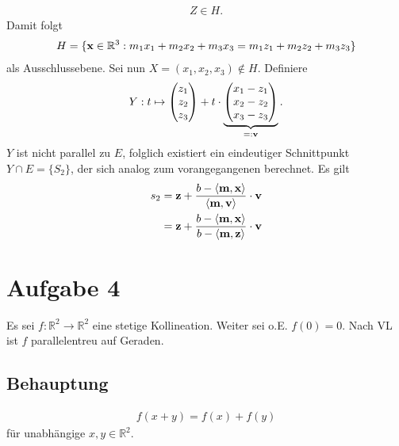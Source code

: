 \documentclass[11pt]{article}
\renewcommand{\vec}{\textbf}
\begin{document}
\begin{enumerate}
\begin{equation*}
	\begin{aligned}
	Z \in H.
	\end{aligned}
	\end{equation*}
	Damit folgt
	\begin{equation*}
	\begin{aligned}
	H = \lbrace \vec x \in \mathbb{R}^3 : m_1x_1 + m_2x_2 + m_3x_3 = m_1z_1 + m_2z_2 + m_3z_3 \rbrace
	\end{aligned}
	\end{equation*}
	als Ausschlussebene. Sei nun $ X = (x_1,x_2,x_3) \notin H $. Definiere
	\begin{equation*}
	\begin{aligned}
	Y : t \mapsto \begin{pmatrix}
	z_1 \\ z_2 \\ z_3
	\end{pmatrix} + t \cdot \underbrace{\begin{pmatrix}
	x_1 - z_1\\
	x_2 - z_2\\
	x_3 - z_3
	\end{pmatrix}}_{=:\vec v}.
	\end{aligned}
	\end{equation*}
	$ Y $ ist nicht parallel zu $ E $, folglich existiert ein eindeutiger Schnittpunkt $ Y \cap E = \lbrace S_2\rbrace $, der sich analog zum vorangegangenen berechnet. Es gilt
	\begin{equation*}
	\begin{aligned}
	s_2 &= \vec z + \frac{b - \langle \vec m,\vec x\rangle}{\langle \vec m, \vec v \rangle} \cdot \vec v\\
	&=\vec z + \frac{b - \langle \vec m,\vec x\rangle}{b - \langle \vec m, \vec z \rangle} \cdot \vec v
	\end{aligned}
	\end{equation*}
\end{enumerate}

\newpage
\section*{Aufgabe 4}
Es sei $ f: \mathbb{R}^2 \to \mathbb{R}^2 $ eine stetige Kollineation. Weiter sei o.E. $ f(0) = 0 $. Nach VL ist $ f $ parallelentreu auf Geraden.
\subsection*{Behauptung}
\begin{equation*}
\begin{aligned}
f(x+y) = f(x) + f(y)
\end{aligned}
\end{equation*}
für unabhängige $ x,y \in \mathbb{R}^2 $.
\end{document}

